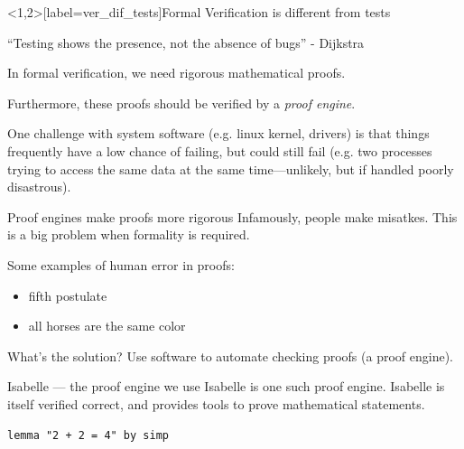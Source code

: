 \documentclass{beamer}
\begin{document}
\begin{frame}<1,2>[label=ver_dif_tests]{Formal Verification is different from tests}

    ``Testing shows the presence, not the absence of bugs'' - Dijkstra
    \vspace{20pt}
    
    In formal verification, we need rigorous mathematical proofs.
    
    Furthermore, these proofs should be verified
    by a \alert<2,3,4>{\it proof engine}.
    \vspace{20pt}
    
    One challenge with \alert<4>{system software} (e.g. linux kernel, drivers) is that things
    frequently have a low chance of failing, but could still fail (e.g. two processes trying to access
    the same data at the same time---unlikely, but
    if handled poorly disastrous).
\end{frame}

\begin{frame}{Proof engines make proofs more rigorous}
    Infamously, people make misatkes.
    This is a big problem when formality is required.

    Some examples of human error in proofs:
    \begin{itemize}
        \item fifth postulate
        \item all horses are the same color
    \end{itemize}

    What's the solution?
    Use software to automate checking proofs (a proof engine).

\end{frame}

\begin{frame}[fragile]{Isabelle --- the proof engine we use}
    Isabelle is one such proof engine.
    Isabelle is itself verified correct, and provides tools to prove mathematical statements.
    \begin{lstlisting}
lemma "2 + 2 = 4" by simp
    \end{lstlisting}
\end{frame}


\end{document}
